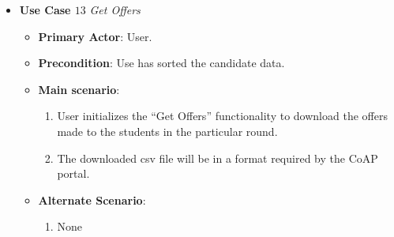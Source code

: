 \documentclass{report}
\begin{document}
\begin{tcolorbox}[colframe=white, colback=lightred, arc=8pt]
\begin{itemize}
    \item \textbf{Use Case $13$} \textit{Get Offers
}\\
    \begin{itemize}
        \item \textbf{Primary Actor}: User.
        \item \textbf{Precondition}: Use has sorted the candidate data.
        \item \textbf{Main scenario}: \begin{enumerate}
            \item User initializes the “Get Offers” functionality to download the offers made to the students in the particular round. 
            \item The downloaded csv file will be in a format required by the CoAP portal.
        \end{enumerate}
       \item \textbf{Alternate Scenario}: 
       \begin{enumerate}
           \item 
           None
       \end{enumerate}
    \end{itemize}
\end{itemize}
    
\end{tcolorbox}
\end{document}
